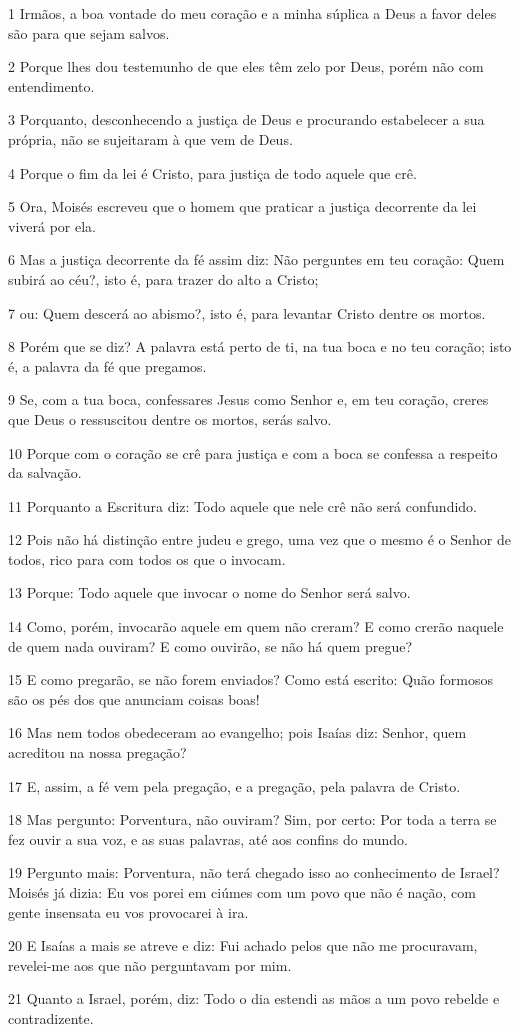 \par 1 Irmãos, a boa vontade do meu coração e a minha súplica a Deus a favor deles são para que sejam salvos.
\par 2 Porque lhes dou testemunho de que eles têm zelo por Deus, porém não com entendimento.
\par 3 Porquanto, desconhecendo a justiça de Deus e procurando estabelecer a sua própria, não se sujeitaram à que vem de Deus.
\par 4 Porque o fim da lei é Cristo, para justiça de todo aquele que crê.
\par 5 Ora, Moisés escreveu que o homem que praticar a justiça decorrente da lei viverá por ela.
\par 6 Mas a justiça decorrente da fé assim diz: Não perguntes em teu coração: Quem subirá ao céu?, isto é, para trazer do alto a Cristo;
\par 7 ou: Quem descerá ao abismo?, isto é, para levantar Cristo dentre os mortos.
\par 8 Porém que se diz? A palavra está perto de ti, na tua boca e no teu coração; isto é, a palavra da fé que pregamos.
\par 9 Se, com a tua boca, confessares Jesus como Senhor e, em teu coração, creres que Deus o ressuscitou dentre os mortos, serás salvo.
\par 10 Porque com o coração se crê para justiça e com a boca se confessa a respeito da salvação.
\par 11 Porquanto a Escritura diz: Todo aquele que nele crê não será confundido.
\par 12 Pois não há distinção entre judeu e grego, uma vez que o mesmo é o Senhor de todos, rico para com todos os que o invocam.
\par 13 Porque: Todo aquele que invocar o nome do Senhor será salvo.
\par 14 Como, porém, invocarão aquele em quem não creram? E como crerão naquele de quem nada ouviram? E como ouvirão, se não há quem pregue?
\par 15 E como pregarão, se não forem enviados? Como está escrito: Quão formosos são os pés dos que anunciam coisas boas!
\par 16 Mas nem todos obedeceram ao evangelho; pois Isaías diz: Senhor, quem acreditou na nossa pregação?
\par 17 E, assim, a fé vem pela pregação, e a pregação, pela palavra de Cristo.
\par 18 Mas pergunto: Porventura, não ouviram? Sim, por certo: Por toda a terra se fez ouvir a sua voz, e as suas palavras, até aos confins do mundo.
\par 19 Pergunto mais: Porventura, não terá chegado isso ao conhecimento de Israel? Moisés já dizia: Eu vos porei em ciúmes com um povo que não é nação, com gente insensata eu vos provocarei à ira.
\par 20 E Isaías a mais se atreve e diz: Fui achado pelos que não me procuravam, revelei-me aos que não perguntavam por mim.
\par 21 Quanto a Israel, porém, diz: Todo o dia estendi as mãos a um povo rebelde e contradizente.

